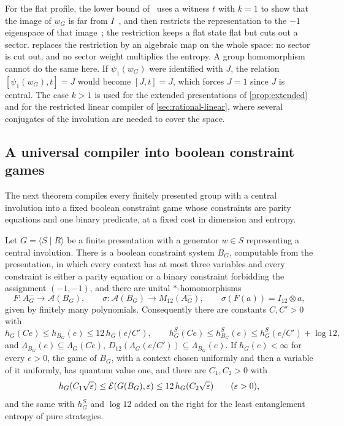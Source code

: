 For the flat profile, the lower bound of~\cite[Proposition~6.2]{SV18} uses a witness $t$ with $k=1$ to show that the image
of $w_G$ is far from $I$~\cite[Lemma~6.3]{SV18}, and then restricts the representation to the $-1$ eigenspace of that
image~\cite[Proposition~2.7]{SV18}; the restriction keeps a flat state flat but cuts out a sector. 
replaces the restriction by an algebraic map on the whole space: no sector is cut out, and no sector weight multiplies
the entropy. A group homomorphism cannot do the same here. If $\psi_1(w_G)$ were identified with $J$, the relation
$[\psi_1(w_G),t]=J$ would become $[J,t]=J$, which forces $J=1$ since $J$ is central. The case $k>1$ is used for the
extended presentations of \cref{prop:extended} and for the restricted linear compiler of \cref{sec:rational-linear}, where
several conjugates of the involution are needed to cover the space.

\subsection{A universal compiler into boolean constraint games}\label{sec:compile-universal}

The next theorem compiles every finitely presented group with a central involution into a fixed boolean constraint
game whose constraints are parity equations and one binary predicate, at a fixed cost in dimension and entropy.

\begin{theorem}\label{thm:universal}
Let $G=\langle S\mid R\rangle$ be a finite presentation with a generator $w\in S$ representing a central involution. There
is a boolean constraint system $B_G$, computable from the presentation, in which every context has at most three variables
and every constraint is either a parity equation or a binary constraint forbidding the assignment $(-1,-1)$, and there are
unital $*$-homomorphisms
\[
F:A_G^-\to\mathcal A(B_G),\qquad\sigma:\mathcal A(B_G)\to M_{12}(A_G^-),\qquad\sigma(F(a))=I_{12}\otimes a ,
\]
given by finitely many polynomials. Consequently there are constants $C,C'>0$ with
\[
h_G(Ce)\le h_{B_G}(e)\le12\,h_G(e/C'),\qquad h^S_G(Ce)\le h^S_{B_G}(e)\le h^S_G(e/C')+\log12 ,
\]
and $\Lambda_{B_G}(e)\subseteq\Lambda_G(Ce)$, $D_{12}(\Lambda_G(e/C'))\subseteq\Lambda_{B_G}(e)$. If $h_G(e)<\infty$ for every $e>0$,
the game of $B_G$, with a context chosen uniformly and then a variable of it uniformly, has quantum value one, and there are
$C_1,C_2>0$ with
\[
h_G(C_1\sqrt{\varepsilon})\le\mathcal E(G(B_G),\varepsilon)\le12\,h_G(C_2\sqrt{\varepsilon})\qquad(\varepsilon>0),
\]
and the same with $h^S_G$ and $\log12$ added on the right for the least entanglement entropy of pure strategies.
\end{theorem}

